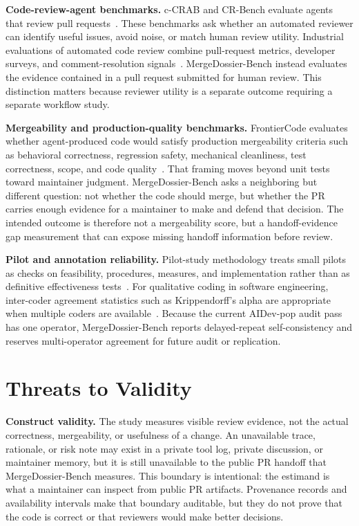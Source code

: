 \documentclass[10pt,conference]{IEEEtran}
\newcommand{\tool}{MergeDossier-Bench}
\begin{document}
\textbf{Code-review-agent benchmarks.}
c-CRAB and CR-Bench evaluate agents that review pull requests~\cite{ccrab,crbench}.
These benchmarks ask whether an automated reviewer can identify useful issues, avoid noise, or match human review utility.
Industrial evaluations of automated code review combine pull-request metrics, developer surveys, and comment-resolution signals~\cite{cihan2024AutomatedCodeReview}.
\tool{} instead evaluates the evidence contained in a pull request submitted for human review.
This distinction matters because reviewer utility is a separate outcome requiring a separate workflow study.

\textbf{Mergeability and production-quality benchmarks.}
FrontierCode evaluates whether agent-produced code would satisfy production mergeability criteria such as behavioral correctness, regression safety, mechanical cleanliness, test correctness, scope, and code quality~\cite{frontiercode}.
That framing moves beyond unit tests toward maintainer judgment.
\tool{} asks a neighboring but different question: not whether the code should merge, but whether the PR carries enough evidence for a maintainer to make and defend that decision.
The intended outcome is therefore not a mergeability score, but a handoff-evidence gap measurement that can expose missing handoff information before review.

\textbf{Pilot and annotation reliability.}
Pilot-study methodology treats small pilots as checks on feasibility, procedures, measures, and implementation rather than as definitive effectiveness tests~\cite{leon2011Pilot,thabane2010Pilot}.
For qualitative coding in software engineering, inter-coder agreement statistics such as Krippendorff's alpha are appropriate when multiple coders are available~\cite{gonzalezPrieto2020Reliability}.
Because the current AIDev-pop audit pass has one operator, \tool{} reports delayed-repeat self-consistency and reserves multi-operator agreement for future audit or replication.

\section{Threats to Validity}

\textbf{Construct validity.}
The study measures visible review evidence, not the actual correctness, mergeability, or usefulness of a change.
An unavailable trace, rationale, or risk note may exist in a private tool log, private discussion, or maintainer memory, but it is still unavailable to the public PR handoff that \tool{} measures.
This boundary is intentional: the estimand is what a maintainer can inspect from public PR artifacts.
Provenance records and availability intervals make that boundary auditable, but they do not prove that the code is correct or that reviewers would make better decisions.
\end{document}
